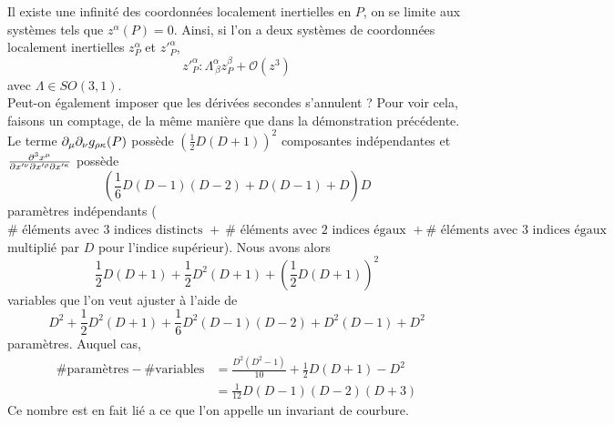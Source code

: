 \documentclass[a4paper,11pt]{report}
\begin{document}
            Il existe une infinité des coordonnées localement inertielles en $P$, on se limite aux systèmes tels que $z^\alpha(P) = 0$. Ainsi, si l'on a deux systèmes de coordonnées localement inertielles $z^\alpha_P$ et $z'^\alpha_P$, 
            \begin{equation}
                z'^\alpha_P : \Lambda^\alpha_{~\beta}z^\beta_P+\mathcal{O}(z^3)
            \end{equation}
            avec $\Lambda\in SO(3,1)$.\\
            
            Peut-on également imposer que les dérivées secondes s'annulent ? Pour voir cela, faisons un comptage, de la même manière que dans la démonstration précédente. Le terme $\partial_\mu\partial_\nu g_{\rho\kappa}(P)$ possède $\left(\frac{1}{2}D(D+1)\right)^2$ composantes indépendantes et $\frac{\partial^3 x^\mu}{\partial x'^\nu\partial x'^\rho\partial x'^\kappa}$ possède
            \begin{equation}
                \left(\frac{1}{6}D(D-1)(D-2)+D(D-1)+D\right)D
            \end{equation} paramètres indépendants ($\#\text{ éléments avec 3 indices distincts }+~\#\text{ éléments avec 2 indices égaux }+\#\text{ éléments avec 3 indices égaux}$ multiplié par $D$ pour l'indice supérieur). Nous avons alors
            \begin{equation}
                \frac{1}{2}D(D+1)+\frac{1}{2}D^2(D+1)+\left(\frac{1}{2}D(D+1)\right)^2
            \end{equation}
            variables que l'on veut ajuster à l'aide de
            \begin{equation}
                D^2+\frac{1}{2}D^2(D+1)+\frac{1}{6}D^2(D-1)(D-2)+D^2(D-1)+D^2
            \end{equation}
            paramètres. Auquel cas,
            \begin{align}
                \#\text{paramètres}-\#\text{variables} &= \frac{D^2(D^2-1)}{10}+\frac{1}{2}D(D+1)-D^2\\
                &= \frac{1}{12}D(D-1)(D-2)(D+3)
            \end{align}
            Ce nombre est en fait lié a ce que l'on appelle un invariant de courbure.
            
\end{document}
